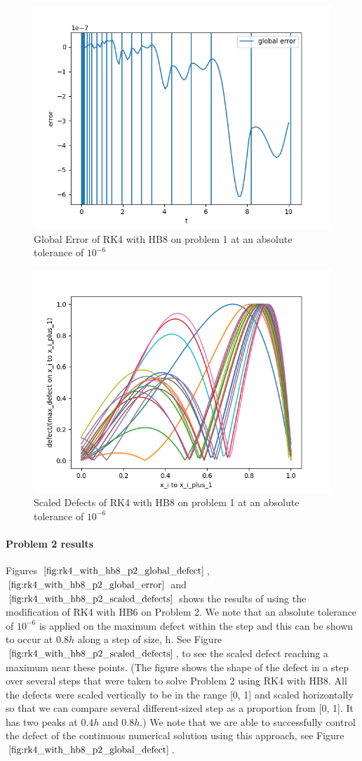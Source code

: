 \documentclass{article}
\begin{document}
\begin{figure}[H]
\centering
\includegraphics[width=0.7\linewidth]{./figures/rk4_with_hb8_p1_global_error}
\caption{Global Error of RK4 with HB8 on problem 1 at an absolute tolerance of $10^{-6}$}
\label{fig:rk4_with_hb8_p1_global_error}
\end{figure}

\begin{figure}[H]
\centering
\includegraphics[width=0.7\linewidth]{./figures/rk4_with_hb8_p1_scaled_defects}
\caption{Scaled Defects of RK4 with HB8 on problem 1 at an absolute tolerance of $10^{-6}$}
\label{fig:rk4_with_hb8_p1_scaled_defects}
\end{figure}

\paragraph{Problem 2 results}
Figures $\ref{fig:rk4_with_hb8_p2_global_defect}$, $\ref{fig:rk4_with_hb8_p2_global_error}$ and $\ref{fig:rk4_with_hb8_p2_scaled_defects}$ shows the results of using the modification of RK4 with HB6 on Problem 2. We note that an absolute tolerance of $10^{-6}$ is applied on the maximum defect within the step and this can be shown to occur at $0.8h$ along a step of size, h. See Figure $\ref{fig:rk4_with_hb8_p2_scaled_defects}$, to see the scaled defect reaching a maximum near these points. (The figure shows the shape of the defect in a step over several steps that were taken to solve Problem 2 using RK4 with HB8. All the defects were scaled vertically to be in the range [0, 1] and scaled horizontally so that we can compare several different-sized step as a proportion from [0, 1]. It has two peaks at $0.4h$ and $0.8h$.) We note that we are able to successfully control the defect of the continuous numerical solution using this approach, see Figure $\ref{fig:rk4_with_hb8_p2_global_defect}$. 
\end{document}
